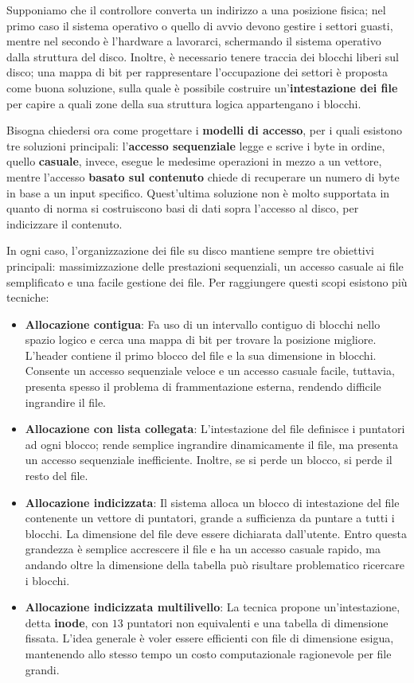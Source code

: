 \noindent Supponiamo che il controllore converta un indirizzo a una posizione fisica; nel primo caso il sistema operativo o quello di avvio devono
gestire i settori guasti, mentre nel secondo è l'hardware a lavorarci, schermando il sistema operativo dalla struttura del disco. Inoltre, è necessario
tenere traccia dei blocchi liberi sul disco; una mappa di bit per rappresentare l'occupazione dei settori è proposta come buona soluzione, sulla quale è
possibile costruire un'\textbf{intestazione dei file} per capire a quali zone della sua struttura logica appartengano i blocchi.\par
Bisogna chiedersi ora come progettare i \textbf{modelli di accesso}, per i quali esistono tre soluzioni principali: l'\textbf{accesso sequenziale} legge
e scrive i byte in ordine, quello \textbf{casuale}, invece, esegue le medesime operazioni in mezzo a un vettore, mentre l'accesso \textbf{basato sul
contenuto} chiede di recuperare un numero di byte in base a un input specifico. Quest'ultima soluzione non è molto supportata in quanto di norma si
costruiscono basi di dati sopra l'accesso al disco, per indicizzare il contenuto.\par
In ogni caso, l'organizzazione dei file su disco mantiene sempre tre obiettivi principali: massimizzazione delle prestazioni sequenziali, un accesso
casuale ai file semplificato e una facile gestione dei file. Per raggiungere questi scopi esistono più tecniche: \begin{itemize}
    \item \textbf{Allocazione contigua}: Fa uso di un intervallo contiguo di blocchi nello spazio logico e cerca una mappa di bit per trovare la
    posizione migliore. L'header contiene il primo blocco del file e la sua dimensione in blocchi. Consente un accesso sequenziale veloce e un accesso
    casuale facile, tuttavia, presenta spesso il problema di frammentazione esterna, rendendo difficile ingrandire il file.
    \item \textbf{Allocazione con lista collegata}: L'intestazione del file definisce i puntatori ad ogni blocco; rende semplice ingrandire
    dinamicamente il file, ma presenta un accesso sequenziale inefficiente. Inoltre, se si perde un blocco, si perde il resto del file.
    \item \textbf{Allocazione indicizzata}: Il sistema alloca un blocco di intestazione del file contenente un vettore di puntatori, grande a
    sufficienza da puntare a tutti i blocchi. La dimensione del file deve essere dichiarata dall'utente. Entro questa grandezza è semplice accrescere il
    file e ha un accesso casuale rapido, ma andando oltre la dimensione della tabella può risultare problematico ricercare i blocchi.
    \item \textbf{Allocazione indicizzata multilivello}: La tecnica propone un'intestazione, detta \textbf{inode}, con $13$ puntatori non equivalenti e
    una tabella di dimensione fissata. L'idea generale è voler essere efficienti con file di dimensione esigua, mantenendo allo stesso tempo un costo
    computazionale ragionevole per file grandi.
\end{itemize}

